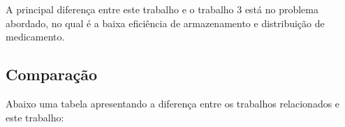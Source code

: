 \documentclass[
    12pt,
    openright,
    oneside,
    a4paper,
    english,
    brazil
]{abntex2}
\begin{document}
A principal diferença entre este trabalho e o trabalho 3 está no problema abordado, no qual é a baixa eficiência de armazenamento e distribuição de medicamento.

\subsection{Comparação}


Abaixo uma tabela apresentando a diferença entre os trabalhos relacionados e este trabalho:
\end{document}

